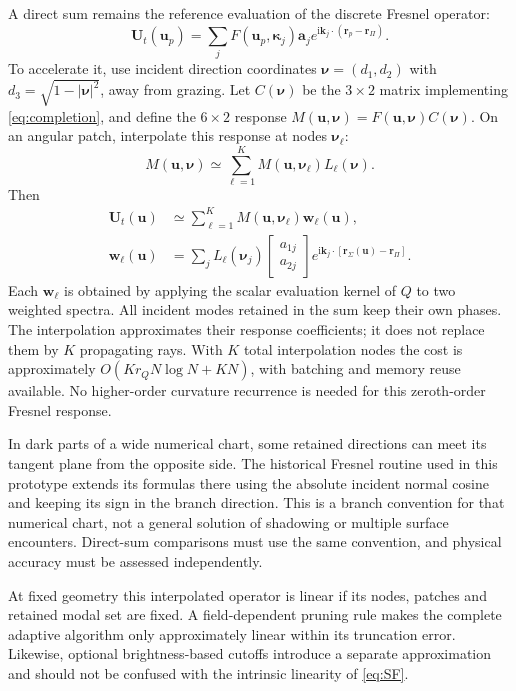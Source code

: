 \documentclass[11pt,a4paper]{article}
\newcommand{\vct}[1]{\bm{#1}}
\newcommand{\kap}{\vct\kappa}
\newcommand{\ii}{\mathrm i}
\numberwithin{equation}{section}
\begin{document}
A direct sum remains the reference evaluation of the discrete Fresnel operator:
\begin{equation}
 \vct U_t(\vct u_p)=\sum_jF(\vct u_p,\kap_j)\vct a_j
                              e^{\ii\vct k_j\cdot(\vct r_p-\vct r_\Pi)}.
 \label{eq:directT}
\end{equation}
To accelerate it, use incident direction coordinates
$\vct\nu=(d_1,d_2)$ with $d_3=\sqrt{1-|\vct\nu|^2}$, away from grazing.
Let $C(\vct\nu)$ be the $3\times2$ matrix implementing
\eqref{eq:completion}, and define the $6\times2$ response
$M(\vct u,\vct\nu)=F(\vct u,\vct\nu)C(\vct\nu)$.
On an angular patch, interpolate this response at nodes $\vct\nu_\ell$:
\begin{equation}
 M(\vct u,\vct\nu)\simeq\sum_{\ell=1}^{K}
      M(\vct u,\vct\nu_\ell)L_\ell(\vct\nu).
 \label{eq:symbolinterp}
\end{equation}
Then
\begin{align}
 \vct U_t(\vct u)&\simeq\sum_{\ell=1}^{K}
        M(\vct u,\vct\nu_\ell)\vct w_\ell(\vct u),\\
 \vct w_\ell(\vct u)&=\sum_jL_\ell(\vct\nu_j)
        \begin{bmatrix}a_{1j}\\a_{2j}\end{bmatrix}
        e^{\ii\vct k_j\cdot[\vct r_\Sigma(\vct u)-\vct r_\Pi]}.
 \label{eq:weightedQ}
\end{align}
Each $\vct w_\ell$ is obtained by applying the scalar evaluation kernel of $Q$
to two weighted spectra. All incident modes retained in the sum keep their
own phases. The interpolation approximates their response coefficients; it
does not replace them by $K$ propagating rays. With $K$ total interpolation
nodes the cost is approximately $O(Kr_QN\log N+KN)$, with batching and memory
reuse available. No higher-order curvature recurrence is needed for this
zeroth-order Fresnel response.

In dark parts of a wide numerical chart, some retained directions can meet
its tangent plane from the opposite side. The historical Fresnel routine used
in this prototype extends its formulas there using the absolute incident
normal cosine and keeping its sign in the branch direction. This is a branch
convention for that numerical chart, not a general solution of shadowing or
multiple surface encounters. Direct-sum comparisons must use the same
convention, and physical accuracy must be assessed independently.

At fixed geometry this interpolated operator is linear if its nodes, patches
and retained modal set are fixed. A field-dependent pruning rule makes the
complete adaptive algorithm only approximately linear within its truncation
error. Likewise, optional brightness-based cutoffs introduce a separate
approximation and should not be confused with the intrinsic linearity of
\eqref{eq:SF}.
\end{document}
